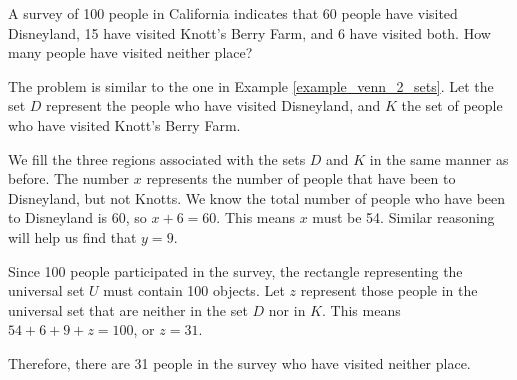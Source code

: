 \begin{example}
    A survey of 100 people in California indicates that 60 people have visited Disneyland, 15 have visited Knott's Berry Farm, and 6 have visited both. How many people have visited neither place?
\end{example}
\begin{solution}
    The problem is similar to the one in Example \ref{example_venn_2_sets}. Let the set \( D \) represent the people who have visited Disneyland, and \( K \) the set of people who have visited Knott's Berry Farm.

    \begin{center}
        \begin{venndiagram2sets}[
                labelA=\(D\),
                labelB=\(K\),
                labelAB={6},
                labelOnlyA={x},
                labelOnlyB={y},
            ]
        \end{venndiagram2sets}
    \end{center}

    We fill the three regions associated with the sets \( D \) and \( K \) in the same manner as before. The number $x$ represents the number of people that have been to Disneyland, but not Knotts. We know the total number of people who have been to Disneyland is 60, so $x + 6 = 60$. This means $x$ must be 54. Similar reasoning will help us find that $y = 9$.

    \begin{center}
        \begin{venndiagram2sets}[
                labelA=\(D\),
                labelB=\(K\),
                labelAB={6},
                labelOnlyA={54},
                labelOnlyB={9},
            ]
        \end{venndiagram2sets}
    \end{center}


    Since 100 people participated in the survey, the rectangle representing the universal set \( U \) must contain 100 objects. Let \( z \) represent those people in the universal set that are neither in the set \( D \) nor in \( K \). This means \( 54 + 6 + 9 + z = 100 \), or \( z = 31 \).

    Therefore, there are 31 people in the survey who have visited neither place.
    \begin{center}
        \begin{venndiagram2sets}[
                labelA=\(D\),
                labelB=\(K\),
                labelAB={6},
                labelOnlyA={54},
                labelOnlyB={9},
            ]
        \end{venndiagram2sets}
    \end{center}
\end{solution}

